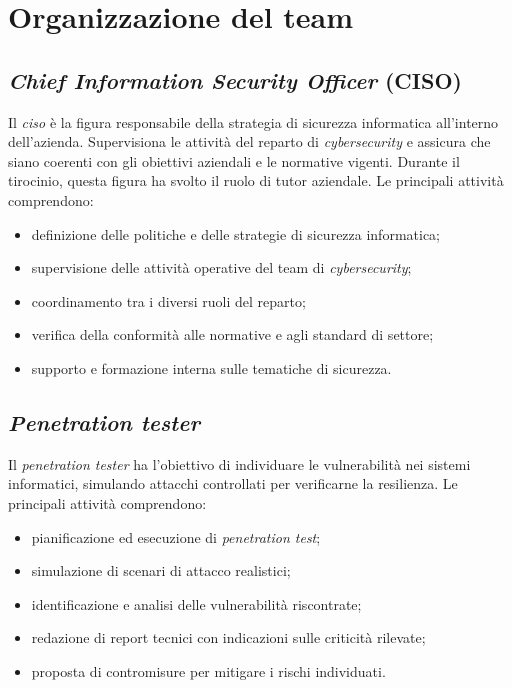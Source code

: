\section{Organizzazione del team}
\subsection{\textit{Chief Information Security Officer} (CISO)}
Il \textit{\gls{ciso}} è la figura responsabile della strategia di sicurezza informatica all'interno dell'azienda. Supervisiona le attività del reparto di \textit{cybersecurity} e assicura che siano coerenti con gli obiettivi aziendali e le normative vigenti. Durante il tirocinio, questa figura ha svolto il ruolo di tutor aziendale.  
Le principali attività comprendono:
\begin{itemize}
    \item definizione delle politiche e delle strategie di sicurezza informatica;
    \item supervisione delle attività operative del team di \textit{cybersecurity};
    \item coordinamento tra i diversi ruoli del reparto;
    \item verifica della conformità alle normative e agli standard di settore;
    \item supporto e formazione interna sulle tematiche di sicurezza.
\end{itemize}
\subsection{\textit{Penetration tester}}
Il \textit{penetration tester} ha l'obiettivo di individuare le vulnerabilità nei sistemi informatici, simulando attacchi controllati per verificarne la resilienza.  
Le principali attività comprendono:
\begin{itemize}
    \item pianificazione ed esecuzione di \textit{penetration test};
    \item simulazione di scenari di attacco realistici;
    \item identificazione e analisi delle vulnerabilità riscontrate;
    \item redazione di report tecnici con indicazioni sulle criticità rilevate;
    \item proposta di contromisure per mitigare i rischi individuati.
\end{itemize}
